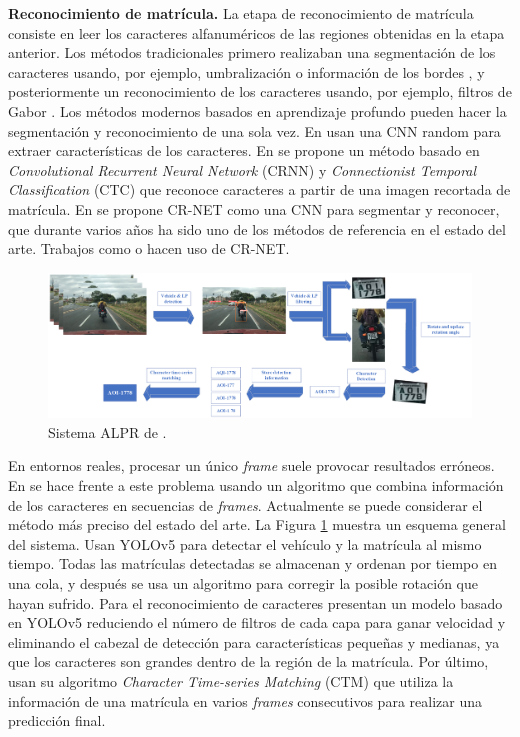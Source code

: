 \documentclass[a4paper, oneside, onecolumn, 11pt]{article}
\begin{document}
\noindent\textbf{Reconocimiento de matrícula.} La etapa de reconocimiento de matrícula consiste en leer los caracteres alfanuméricos de las regiones obtenidas en la etapa anterior. Los métodos tradicionales \cite{Du2013} primero realizaban una segmentación de los caracteres usando, por ejemplo, umbralización \cite{miyamoto1991vehicle} o información de los bordes \cite{capar2006concurrent}, y posteriormente un reconocimiento de los caracteres usando, por ejemplo, filtros de Gabor \cite{hu2002recognition}. Los métodos modernos basados en aprendizaje profundo pueden hacer la segmentación y reconocimiento de una sola vez. En \cite{Menotti2014} usan una CNN random para extraer características de los caracteres. En \cite{Wang2019} se propone un método basado en \textit{Convolutional Recurrent Neural Network} (CRNN) y \textit{Connectionist Temporal Classification} (CTC) \cite{shi2016end} que reconoce caracteres a partir de una imagen recortada de matrícula. En \cite{montazzolli2017real} se propone CR-NET como una CNN para segmentar y reconocer, que durante varios años ha sido uno de los métodos de referencia en el estado del arte. Trabajos como \cite{laroca2018robust} o \cite{laroca2021efficient} hacen uso de CR-NET.

\begin{figure} [h]
    \begin{center}
      \includegraphics[width=\textwidth]{figs/alpr.png}
    \end{center}
    \caption{Sistema ALPR de \cite{Quang2022}.}
    \label{fig:alpr}
\end{figure}

En entornos reales, procesar un único \textit{frame} suele provocar resultados erróneos. En \cite{Quang2022} se hace frente a este problema usando un algoritmo que combina información de los caracteres en secuencias de \textit{frames}. Actualmente se puede considerar el método más preciso del estado del arte. La Figura \ref{fig:alpr} muestra un esquema general del sistema. Usan YOLOv5 para detectar el vehículo y la matrícula al mismo tiempo. Todas las matrículas detectadas se almacenan y ordenan por tiempo en una cola, y después se usa un algoritmo para corregir la posible rotación que hayan sufrido. Para el reconocimiento de caracteres presentan un modelo basado en YOLOv5 reduciendo el número de filtros de cada capa para ganar velocidad y eliminando el cabezal de detección para características pequeñas y medianas, ya que los caracteres son grandes dentro de la región de la matrícula. Por último, usan su algoritmo \textit{Character Time-series Matching} (CTM) que utiliza la información de una matrícula en varios \textit{frames} consecutivos para realizar una predicción final.
\end{document}
